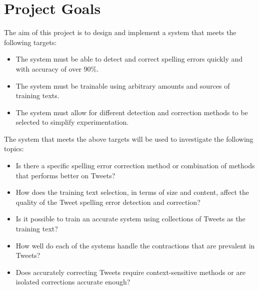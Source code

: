 \section{Project Goals}
The aim of this project is to design and implement a system that meets the following targets: 
\begin{itemize}
\item
The system must be able to detect and correct spelling errors quickly and with accuracy of over 90\%.
\item
The system must be trainable using arbitrary amounts and sources of training texts.
\item
The system must allow for different detection and correction methods to be selected to simplify experimentation.
\end{itemize}
The system that meets the above targets will be used to investigate the following topics:
\begin{itemize}
\item
Is there a specific spelling error correction method or combination of methods that performs better on Tweets?
\item
How does the training text selection, in terms of size and content, affect the quality of the Tweet spelling error detection and correction?
\item
Is it possible to train an accurate system using collections of Tweets as the training text?
\item
How well do each of the systems handle the contractions that are prevalent in Tweets?
\item
Does accurately correcting Tweets require context-sensitive methods or are isolated corrections accurate enough?
\end{itemize}